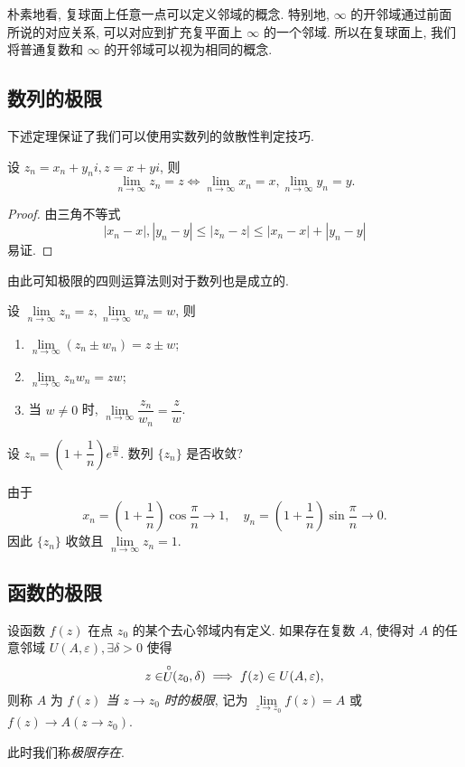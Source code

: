 朴素地看, 复球面上任意一点可以定义邻域的概念.
特别地, $\infty$ 的开邻域通过前面所说的对应关系, 可以对应到扩充复平面上 $\infty$ 的一个邻域.
所以在复球面上, 我们将普通复数和 $\infty$ 的开邻域可以视为相同的概念.


\subsection{数列的极限}

下述定理保证了我们可以使用实数列的敛散性判定技巧.

\begin{theorem}[复数列极限的等价刻画]
  设 $z_n=x_n+y_ni,z=x+yi$, 则
  \[\lim_{n\to\infty}z_n=z\iff \lim_{n\to\infty}x_n=x,\lim_{n\to\infty}y_n=y.\]
\end{theorem}

\begin{proof}
  由三角不等式
  \[|x_n-x|,|y_n-y|\le|z_n-z|\le|x_n-x|+|y_n-y|\]
  易证.
\end{proof}

由此可知极限的四则运算法则对于数列也是成立的.
\begin{theorem}[数列极限的四则运算法则]
  设 $\lim\limits_{n\to\infty}z_n=z,\lim\limits_{n\to\infty}w_n=w$, 则
  \begin{enumerate}
    \item $\lim\limits_{n\to\infty}(z_n\pm w_n)=z\pm w$;
    \item $\lim\limits_{n\to\infty} z_nw_n=zw$;
    \item 当 $w\neq 0$ 时, $\lim\limits_{n\to\infty}\dfrac{z_n}{w_n}=\dfrac zw$.
  \end{enumerate}
\end{theorem}

\begin{example}
  设 $z_n=\left(1+\dfrac1n\right)e^{\frac{\pi i}n}$. 数列 $\{z_n\}$ 是否收敛?
\end{example}

\begin{solution}
  由于
  \[x_n=\left(1+\frac1n\right)\cos\frac\pi n\to 1,\quad
  y_n=\left(1+\frac1n\right)\sin\frac\pi n\to 0.\]
  {因此 $\{z_n\}$ 收敛且 $\lim\limits_{n\to\infty}z_n=1$.}
\end{solution}

\subsection{函数的极限}

\begin{definition}
  设函数 $f(z)$ 在点 $z_0$ 的某个去心邻域内有定义.
  如果存在复数 $A$, 使得对 $A$ 的任意邻域 $U(A,\varepsilon),\exists\delta>0$ 使得
    \[z\in\stackrel{\circ}{U}\!\!(z_0,\delta)\implies f(z)\in U(A,\varepsilon),\]
  则称 $A$ 为 \emph{$f(z)$ 当 $z\to z_0$ 时的极限}, 记为 \emph{$\lim\limits_{z\to z_0}f(z)=A$} 或 \emph{$f(z)\to A (z\to z_0)$}.
\end{definition}
此时我们称\emph{极限存在}.

